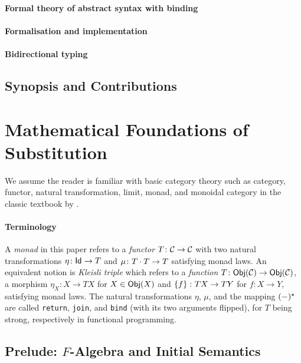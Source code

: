 \documentclass[acmsmall,review]{acmart}\settopmatter{printfolios=true,printccs=false,printacmref=false}
\theoremstyle{acmdefinition}
\begin{document}
\paragraph{Formal theory of abstract syntax with binding} \citep{Altenkirch1999a,Fiore1999,Fiore2008,Matthes2004,Tanaka2006,Ahrens2018b,Ahrens2018}
\paragraph{Formalisation and implementation} \citep{Allais2018,Allais2021}\citep{Ahrens2022}\citep{Fiore2022}
\paragraph{Bidirectional typing} \citep{Dunfield2021}

\subsection{Synopsis and Contributions}

\section{Mathematical Foundations of Substitution}
We assume the reader is familiar with basic category theory such as category, functor, natural transformation, limit, monad, and monoidal category in the classic textbook by \citet{MacLane1978}. 

\paragraph{Terminology} A \emph{monad} in this paper refers to a \emph{functor} $T\colon \mathcal{C} \to \mathcal{C}$ with two natural transformations $\eta\colon \mathsf{Id}_{} \to T$ and $\mu\colon T\cdot T \to T$ satisfying monad laws.
An equivalent notion is \emph{Kleisli triple} which refers to a \emph{function} $T\colon \mathsf{Obj}({\mathcal{C}}) \to \mathsf{Obj}({\mathcal{C}})$, a morphism $\eta_X \colon X \to T X$ for $X \in \mathsf{Obj}({X})$ and $\left\{{f}\right\} \colon T X \to TY$ for $f\colon X \to Y$, satisfying monad laws.
The natural transformations $\eta$, $\mu$, and the mapping $({-})^\star$ are called \texttt{return}, \texttt{join}, and \texttt{bind} (with its two arguments flipped), for $T$ being strong, respectively in functional programming.


\subsection{Prelude: \texorpdfstring{$F$}{F}-Algebra and Initial Semantics}
\end{document}
